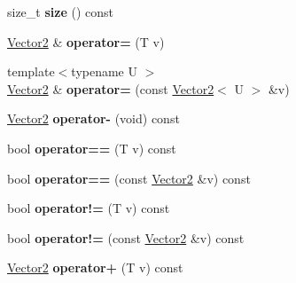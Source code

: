 \begin{DoxyCompactItemize}
\mbox{\label{struct_p_o_p_1_1_vector2_a5861ac8fbf5fcd0ab4ebaaec81be21c4}} 
size\+\_\+t {\bfseries size} () const
\item 
\mbox{\label{struct_p_o_p_1_1_vector2_a75ac55311be70f0f34d8b01d2a77a0ea}} 
\mbox{\hyperlink{struct_p_o_p_1_1_vector2}{Vector2}} \& {\bfseries operator=} (T v)
\item 
\mbox{\label{struct_p_o_p_1_1_vector2_a927cb8f2968086d71ae190f532e19bd9}} 
{\footnotesize template$<$typename U $>$ }\\\mbox{\hyperlink{struct_p_o_p_1_1_vector2}{Vector2}} \& {\bfseries operator=} (const \mbox{\hyperlink{struct_p_o_p_1_1_vector2}{Vector2}}$<$ U $>$ \&v)
\item 
\mbox{\label{struct_p_o_p_1_1_vector2_a09ce7162d7b43260623a1273b66ec56b}} 
\mbox{\hyperlink{struct_p_o_p_1_1_vector2}{Vector2}} {\bfseries operator-\/} (void) const
\item 
\mbox{\label{struct_p_o_p_1_1_vector2_a882e53f7f09356e6afc3f85a6233e26e}} 
bool {\bfseries operator==} (T v) const
\item 
\mbox{\label{struct_p_o_p_1_1_vector2_acaa866ee7a6c903173bdb373ec6f7135}} 
bool {\bfseries operator==} (const \mbox{\hyperlink{struct_p_o_p_1_1_vector2}{Vector2}} \&v) const
\item 
\mbox{\label{struct_p_o_p_1_1_vector2_a20719cd1b0199338558857352f629a33}} 
bool {\bfseries operator!=} (T v) const
\item 
\mbox{\label{struct_p_o_p_1_1_vector2_accac87a85278664e429260768e1bf161}} 
bool {\bfseries operator!=} (const \mbox{\hyperlink{struct_p_o_p_1_1_vector2}{Vector2}} \&v) const
\item 
\mbox{\label{struct_p_o_p_1_1_vector2_a746b655a75f6295169763b03eb4c01a1}} 
\mbox{\hyperlink{struct_p_o_p_1_1_vector2}{Vector2}} {\bfseries operator+} (T v) const
\item 
\mbox{\label{struct_p_o_p_1_1_vector2_a75d956cc52c07c7a373d48c33afe58ff}} 

\end{DoxyCompactItemize}
